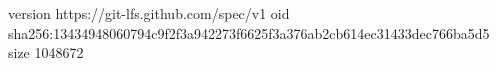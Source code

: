 version https://git-lfs.github.com/spec/v1
oid sha256:13434948060794c9f2f3a942273f6625f3a376ab2cb614ec31433dec766ba5d5
size 1048672
